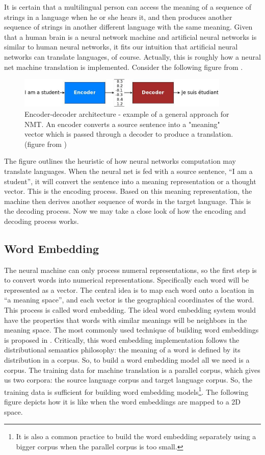 \documentclass[final]{ua-thesis}
\numberwithin{equation}{section}
\begin{document}
It is certain that a multilingual person can access the meaning of a sequence of strings in a language when he or she hears it, and then produces another sequence of strings in another different language with the same meaning. Given that a human brain is a neural network machine and artificial neural networks is similar to human neural networks, it fits our intuition that artificial neural networks can translate languages, of course. Actually, this is roughly how a neural net machine translation is implemented. Consider the following figure from \citet{luong17GitHub}.

\begin{figure}[h]
\caption{Encoder-decoder architecture - example of a general approach for NMT. An encoder converts a source sentence into a "meaning" vector which is passed through a decoder to produce a translation. (figure from \citet{luong17GitHub})}
\centering
\includegraphics[width=0.9\textwidth]{encdec.jpg}
\end{figure} 

The figure outlines the heuristic of how neural networks computation may translate languages. When the neural net is fed with a source sentence, ``I am a student'', it will convert the sentence into a meaning representation or a thought vector. This is the encoding process. Based on this meaning representation, the machine then derives another sequence of words in the target language. This is the decoding process. Now we may take a close look of how the encoding and decoding process works. 

\subsection{Word Embedding}
The neural machine can only process numeral representations, so the first step is to convert words into numerical representations. Specifically each word will be represented as a vector. The central idea is to map each word onto a location in ``a meaning space'', and each vector is the geographical coordinates of the word. 
This process is called word embedding. The ideal word embedding system would have the properties that words with similar meanings will be neighbors in the meaning space. 
The most commonly used technique of building word embeddings is proposed in \citet{mikolov2013efficient, mikolov2013distributed}. Critically, this word embedding implementation follows the distributional semantics philosophy: the meaning of a word is defined by its distribution in a corpus. So, to build a word embedding model all we need is a corpus. The training data for machine translation is a parallel corpus, which gives us two corpora: the source language corpus and target language corpus. So, the training data is sufficient for building word embedding models\footnote{It is also a common practice to build the word embedding separately using a bigger corpus when the parallel corpus is too small.}. The following figure depicts how it is like when the word embeddings are mapped to a 2D space.   
\end{document}
